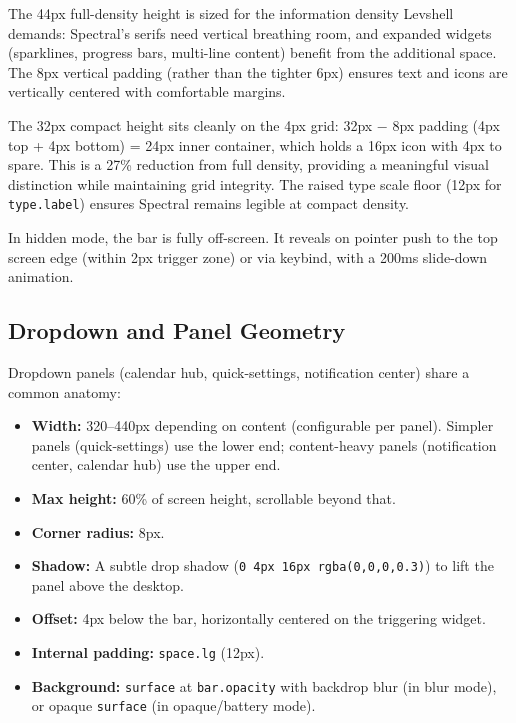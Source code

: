 \documentclass[11pt,a4paper]{article}
\begin{document}
The 44px full-density height is sized for the information density Levshell demands: Spectral's serifs need vertical breathing room, and expanded widgets (sparklines, progress bars, multi-line content) benefit from the additional space. The 8px vertical padding (rather than the tighter 6px) ensures text and icons are vertically centered with comfortable margins.

The 32px compact height sits cleanly on the 4px grid: 32px $-$ 8px padding (4px top + 4px bottom) = 24px inner container, which holds a 16px icon with 4px to spare. This is a 27\% reduction from full density, providing a meaningful visual distinction while maintaining grid integrity. The raised type scale floor (12px for \texttt{type.label}) ensures Spectral remains legible at compact density.

In hidden mode, the bar is fully off-screen. It reveals on pointer push to the top screen edge (within 2px trigger zone) or via keybind, with a 200ms slide-down animation.

\subsection{Dropdown and Panel Geometry}

Dropdown panels (calendar hub, quick-settings, notification center) share a common anatomy:

\begin{itemize}[leftmargin=1.5em, itemsep=2pt]
  \item \textbf{Width:} 320--440px depending on content (configurable per panel). Simpler panels (quick-settings) use the lower end; content-heavy panels (notification center, calendar hub) use the upper end.
  \item \textbf{Max height:} 60\% of screen height, scrollable beyond that.
  \item \textbf{Corner radius:} 8px.
  \item \textbf{Shadow:} A subtle drop shadow (\texttt{0 4px 16px rgba(0,0,0,0.3)}) to lift the panel above the desktop.
  \item \textbf{Offset:} 4px below the bar, horizontally centered on the triggering widget.
  \item \textbf{Internal padding:} \texttt{space.lg} (12px).
  \item \textbf{Background:} \texttt{surface} at \texttt{bar.opacity} with backdrop blur (in blur mode), or opaque \texttt{surface} (in opaque/battery mode).
\end{itemize}
\end{document}
